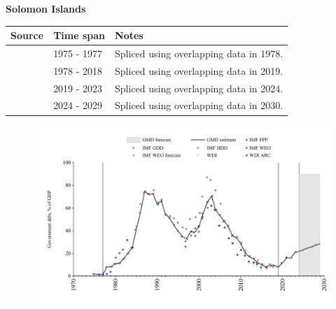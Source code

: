 \documentclass[12pt,a4paper,landscape]{article}
\begin{document}
\begin{adjustbox}{max totalsize={\paperwidth}{\paperheight},center}
\begin{minipage}[t][\textheight][t]{\textwidth}
\vspace*{0.5cm}
{}
\begin{center}
{\Large\bfseries Solomon Islands}
\end{center}
\vspace{0.5cm}
\begin{table}[H]
\centering
\small
\begin{tabular}{|l|l|l|}
\hline
\textbf{Source} & \textbf{Time span} & \textbf{Notes} \\
\hline
\rowcolor{white}\cite{WDI_ARC}& 1975 - 1977 &Spliced using overlapping data in 1978.\\
\rowcolor{lightgray}\cite{IMF_GDD}& 1978 - 2018 &Spliced using overlapping data in 2019.\\
\rowcolor{white}\cite{IMF_FPP}& 2019 - 2023 &Spliced using overlapping data in 2024.\\
\rowcolor{lightgray}\cite{IMF_WEO_forecast}& 2024 - 2029 &Spliced using overlapping data in 2030.\\
\hline
\end{tabular}
\end{table}
\begin{figure}[H]
\centering
\includegraphics[width=\textwidth,height=0.6\textheight,keepaspectratio]{graphs/SLB_govdebt_GDP.pdf}
\end{figure}
\end{minipage}
\end{adjustbox}
\end{document}

